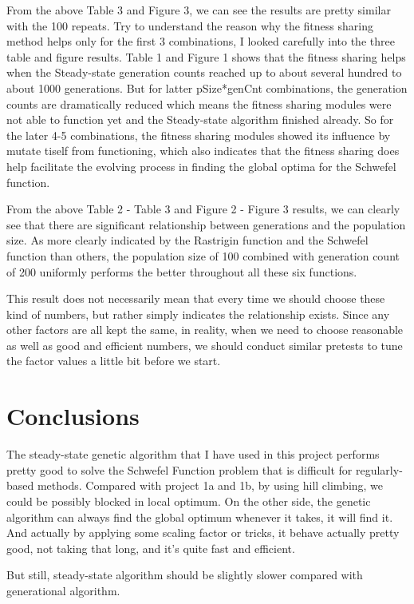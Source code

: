 \documentclass[10pt,b5paper]{article}
\begin{document}
From the above Table 3 and Figure 3, we can see the results are pretty similar with the 100 repeats. Try to understand the reason why the fitness sharing method helps only for the first 3 combinations, I looked carefully into the three table and figure results. Table 1 and Figure 1 shows that the fitness sharing helps when the Steady-state generation counts reached up to about several hundred to about 1000 generations. But for latter pSize*genCnt combinations, the generation counts are dramatically reduced which means the fitness sharing modules were not able to function yet and the Steady-state algorithm finished already. So for the later 4-5 combinations, the fitness sharing modules showed its influence by mutate tiself from functioning, which also indicates that the fitness sharing does help facilitate the evolving process in finding the global optima for the Schwefel function. 

From the above Table 2 - Table 3 and Figure 2 - Figure 3 results, we can clearly see that there are significant relationship between generations and the population size. As more clearly indicated by the Rastrigin function and the Schwefel function than others, the population size of 100 combined with generation count of 200 uniformly performs the better throughout all these six functions.

This result does not necessarily mean that every time we should choose these kind of numbers, but rather simply indicates the relationship exists. Since any other factors are all kept the same, in reality, when we need to choose reasonable as well as good and efficient numbers, we should conduct similar pretests to tune the factor values a little bit before we start.
\section{Conclusions}
\label{sec-4}
The steady-state genetic algorithm that I have used in this project performs pretty good to solve the Schwefel Function problem that is difficult for regularly-based methods. Compared with project 1a and 1b, by using hill climbing, we could be possibly blocked in local optimum. On the other side, the genetic algorithm can always find the global optimum whenever it takes, it will find it. And actually by applying some scaling factor or tricks, it behave actually pretty good, not taking that long, and it's quite fast and efficient. 

But still, steady-state algorithm should be slightly slower compared with generational algorithm.
\end{document}
